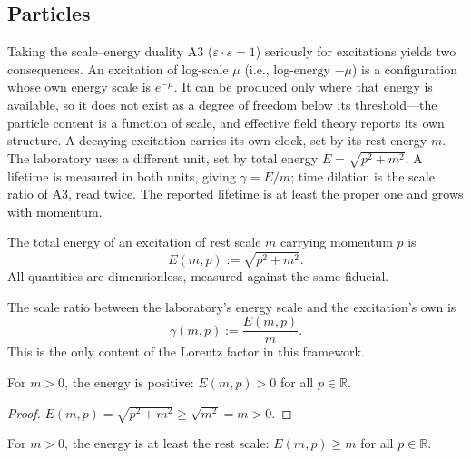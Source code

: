 \subsection{Particles}

Taking the scale–energy duality A3 ($\varepsilon \cdot s = 1$) seriously for excitations yields two consequences. An excitation of log-scale $\mu$ (i.e., log-energy $-\mu$) is a configuration whose own energy scale is $e^{-\mu}$. It can be produced only where that energy is available, so it does not exist as a degree of freedom below its threshold—the particle content is a function of scale, and effective field theory reports its own structure. A decaying excitation carries its own clock, set by its rest energy $m$. The laboratory uses a different unit, set by total energy $E = \sqrt{p^2 + m^2}$. A lifetime is measured in both units, giving $\gamma = E/m$; time dilation is the scale ratio of A3, read twice. The reported lifetime is at least the proper one and grows with momentum.

\begin{definition}
The total energy of an excitation of rest scale $m$ carrying momentum $p$ is
\begin{equation}
E(m, p) := \sqrt{p^2 + m^2} .
\end{equation}
All quantities are dimensionless, measured against the same fiducial.
\end{definition}

\begin{definition}
The scale ratio between the laboratory's energy scale and the excitation's own is
\begin{equation}
\gamma(m, p) := \frac{E(m, p)}{m} .
\end{equation}
This is the only content of the Lorentz factor in this framework.
\end{definition}

\begin{theorem}
For $m > 0$, the energy is positive: $E(m, p) > 0$ for all $p \in \mathbb{R}$.
\end{theorem}

\begin{proof}
$E(m, p) = \sqrt{p^2 + m^2} \geq \sqrt{m^2} = m > 0$.
\end{proof}

\begin{theorem}
For $m > 0$, the energy is at least the rest scale: $E(m, p) \geq m$ for all $p \in \mathbb{R}$.
\end{theorem}


